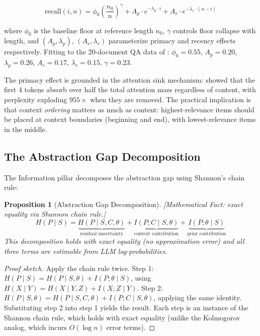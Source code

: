 \documentclass[11pt, a4paper]{googledeepmind}
\newtheorem{proposition}{Proposition}[section]
\begin{document}
\begin{equation}
    \text{recall}(i, n) = \phi_0 \left(\frac{n_0}{n}\right)^{\!\gamma} + A_p \cdot e^{-\lambda_p \cdot i} + A_r \cdot e^{-\lambda_r \cdot (n - i)}
\end{equation}

where $\phi_0$ is the baseline floor at reference length $n_0$, $\gamma$ controls floor collapse with length, and $(A_p, \lambda_p)$, $(A_r, \lambda_r)$ parameterize primacy and recency effects respectively. Fitting to the 20-document QA data of \citet{liu2024lost}: $\phi_0 = 0.55$, $A_p = 0.20$, $\lambda_p = 0.26$, $A_r = 0.17$, $\lambda_r = 0.15$, $\gamma = 0.23$.

The primacy effect is grounded in the attention sink mechanism: \citet{xiao2024efficient} showed that the first 4 tokens absorb over half the total attention mass regardless of content, with perplexity exploding $955\times$ when they are removed. The practical implication is that context \emph{ordering} matters as much as content: highest-relevance items should be placed at context boundaries (beginning and end), with lowest-relevance items in the middle.

\subsection{The Abstraction Gap Decomposition}

The Information pillar decomposes the abstraction gap using Shannon's chain rule:

\begin{proposition}[Abstraction Gap Decomposition]
\emph{[Mathematical Fact: exact equality via Shannon chain rule.]}
\label{thm:gap-decomposition}
\begin{equation}
    H(P \mid S) = \underbrace{H(P \mid S, C, \theta)}_{\text{residual uncertainty}} + \underbrace{I(P; C \mid S, \theta)}_{\text{context contribution}} + \underbrace{I(P; \theta \mid S)}_{\text{prior contribution}}
\end{equation}
This decomposition holds with exact equality (no approximation error) and all three terms are estimable from LLM log-probabilities.
\end{proposition}

\begin{proof}[Proof sketch]
Apply the chain rule twice. Step 1: $H(P \mid S) = H(P \mid S, \theta) + I(P; \theta \mid S)$, using $H(X \mid Y) = H(X \mid Y, Z) + I(X; Z \mid Y)$. Step 2: $H(P \mid S, \theta) = H(P \mid S, C, \theta) + I(P; C \mid S, \theta)$, applying the same identity. Substituting step 2 into step 1 yields the result. Each step is an instance of the Shannon chain rule, which holds with exact equality (unlike the Kolmogorov analog, which incurs $O(\log n)$ error terms).
\end{proof}
\end{document}
